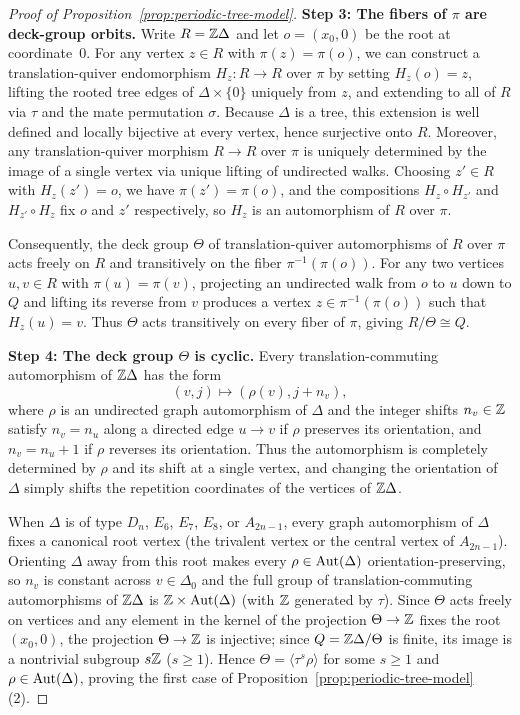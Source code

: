 \begin{proof}[Proof of Proposition~\ref{prop:periodic-tree-model}]
\medskip
\noindent\textbf{Step 3: The fibers of $\pi$ are deck-group orbits.}
Write $R=\mathbb Z\Delta$ and let $o=(x_0,0)$ be the root at coordinate~$0$. For any vertex $z\in R$ with $\pi(z)=\pi(o)$, we can construct a translation-quiver endomorphism $H_z\colon R\to R$ over $\pi$ by setting $H_z(o)=z$, lifting the rooted tree edges of $\Delta\times\{0\}$ uniquely from $z$, and extending to all of $R$ via $\tau$ and the mate permutation $\sigma$. Because $\Delta$ is a tree, this extension is well defined and locally bijective at every vertex, hence surjective onto $R$. Moreover, any translation-quiver morphism $R\to R$ over $\pi$ is uniquely determined by the image of a single vertex via unique lifting of undirected walks. Choosing $z'\in R$ with $H_z(z')=o$, we have $\pi(z')=\pi(o)$, and the compositions $H_z\circ H_{z'}$ and $H_{z'}\circ H_z$ fix $o$ and $z'$ respectively, so $H_z$ is an automorphism of $R$ over $\pi$.

Consequently, the deck group $\Theta$ of translation-quiver automorphisms of $R$ over $\pi$ acts freely on $R$ and transitively on the fiber $\pi^{-1}(\pi(o))$. For any two vertices $u,v\in R$ with $\pi(u)=\pi(v)$, projecting an undirected walk from $o$ to $u$ down to $Q$ and lifting its reverse from $v$ produces a vertex $z\in\pi^{-1}(\pi(o))$ such that $H_z(u)=v$. Thus $\Theta$ acts transitively on every fiber of $\pi$, giving $R/\Theta\cong Q$.

\medskip
\noindent\textbf{Step 4: The deck group $\Theta$ is cyclic.}
Every translation-commuting automorphism of $\mathbb Z\Delta$ has the form
\[
  (v,j)\longmapsto(\rho(v),j+n_v),
\]
where $\rho$ is an undirected graph automorphism of $\Delta$ and the integer shifts $n_v\in\mathbb Z$ satisfy $n_v=n_u$ along a directed edge $u\to v$ if $\rho$ preserves its orientation, and $n_v=n_u+1$ if $\rho$ reverses its orientation. Thus the automorphism is completely determined by $\rho$ and its shift at a single vertex, and changing the orientation of $\Delta$ simply shifts the repetition coordinates of the vertices of $\mathbb Z\Delta$.

When $\Delta$ is of type $D_n$, $E_6$, $E_7$, $E_8$, or $A_{2n-1}$, every graph automorphism of $\Delta$ fixes a canonical root vertex (the trivalent vertex or the central vertex of $A_{2n-1}$). Orienting $\Delta$ away from this root makes every $\rho\in\operatorname{Aut}(\Delta)$ orientation-preserving, so $n_v$ is constant across $v\in\Delta_0$ and the full group of translation-commuting automorphisms of $\mathbb Z\Delta$ is $\mathbb Z\times\operatorname{Aut}(\Delta)$ (with $\mathbb Z$ generated by $\tau$). Since $\Theta$ acts freely on vertices and any element in the kernel of the projection $\Theta\to\mathbb Z$ fixes the root $(x_0,0)$, the projection $\Theta\to\mathbb Z$ is injective; since $Q=\mathbb Z\Delta/\Theta$ is finite, its image is a nontrivial subgroup $s\mathbb Z$ ($s\geq1$). Hence $\Theta=\langle\tau^s\rho\rangle$ for some $s\geq1$ and $\rho\in\operatorname{Aut}(\Delta)$, proving the first case of Proposition~\ref{prop:periodic-tree-model}(2).


\end{proof}
